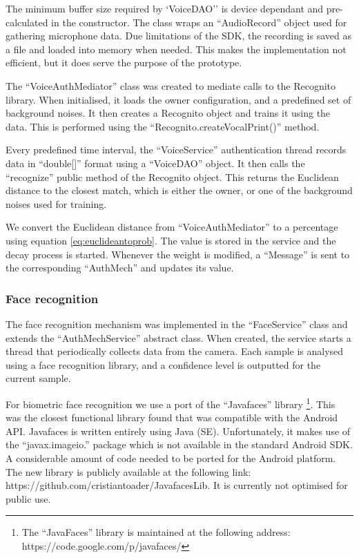 The minimum buffer size required by `VoiceDAO'' is device dependant and pre-calculated in the constructor. The class wraps an ``AudioRecord'' object used for gathering microphone data. Due limitations of the SDK, the recording is saved as a file and loaded into memory when needed. This makes the implementation not efficient, but it does serve the purpose of the prototype.

The ``VoiceAuthMediator'' class was created to mediate calls to the Recognito library. When initialised, it loads the owner configuration, and a predefined set of background noises. It then creates a Recognito object and trains it using the data. This is performed using the ``Recognito.createVocalPrint()'' method.

Every predefined time interval, the ``VoiceService'' authentication thread records data in ``double[]'' format using a ``VoiceDAO'' object. It then calls the ``recognize'' public method of the Recognito object. This returns the Euclidean distance to the closest match, which is either the owner, or one of the background noises used for training. 

 We convert the Euclidean distance from ``VoiceAuthMediator'' to a percentage using equation \ref{eq:euclideantoprob}. The value is stored in the service and the decay process is started. Whenever the weight is modified, a ``Message'' is sent to the corresponding ``AuthMech'' and updates its value. 
 
\subsubsection{Face recognition}
\label{implface}
The face recognition mechanism was implemented in the ``FaceService'' class and extends the ``AuthMechService'' abstract class. When created, the service starts a thread that periodically collects data from the camera. Each sample is analysed using a face recognition library, and a confidence level is outputted for the current sample.

For biometric face recognition we use a port of the ``Javafaces'' library \footnote{The ``JavaFaces'' library is maintained at the following address: https://code.google.com/p/javafaces/}. This was the closest functional library found that was compatible with the Android API. Javafaces is written entirely using Java (SE). Unfortunately, it makes use of the ``javax.imageio.'' package which is not available in the standard Android SDK. A considerable amount of code needed to be ported for the Android platform. The new library is publicly available at the following link: https://github.com/cristiantoader/JavafacesLib. It is currently not optimised for public use.

